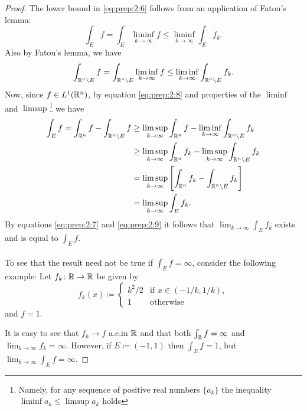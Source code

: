 \begin{proof}
The lower bound in \eqref{eq:prep:2:6} follows from an application of
Fatou's lemma:
\begin{equation}
  \label{eq:prep:2:7}
\int_E f=\int_E\liminf_{k\to\infty} f\leq\liminf_{k\to\infty}\int_E f_k.
\end{equation}
Also by Fatou's lemma, we have
\begin{equation}
  \label{eq:prep:2:8}
\int_{\mathbb{R}^n\setminus E}f=\int_{\mathbb{R}^n\setminus
  E}\liminf_{k\to\infty}f\leq\liminf_{k\to\infty}\int_{\mathbb{R}^n\setminus E}f_k.
\end{equation}
Now, since $f\in L^1(\mathbb{R}^n)$, by equation \eqref{eq:prep:2:8} and
properties of the $\liminf$ and $\limsup$\footnote{Namely, for any sequence
  of positive real numbers $\{a_k\}$ the inequality $\liminf a_k\leq\limsup
  a_k$ holds} we have
\begin{equation}
\label{eq:prep:2:9}
\begin{aligned}
\int_Ef=\int_{\mathbb{R}^n}f-\int_{\mathbb{R}^n\setminus E}f
&\geq\limsup_{k\to\infty}\int_{\mathbb{R}^n}f-\liminf_{k\to\infty}\int_{\mathbb{R}^n\setminus
E}f_k\\
&\geq\limsup_{k\to\infty}\int_{\mathbb{R}^n}f_k-\limsup_{k\to\infty}\int_{\mathbb{R}^n\setminus
  E}f_k\\
&=\limsup_{k\to\infty}\left[\int_{\mathbb{R}^n}f_k-\int_{\mathbb{R}^n\setminus
    E}f_k\right]\\
&=\limsup_{k\to\infty}\int_Ef_k.
\end{aligned}
\end{equation}
By equations \eqref{eq:prep:2:7} and \eqref{eq:prep:2:9} it follows
that $\lim_{k\to\infty}\int_E f_k$ exists and is equal to $\int_E f$.
\\\\
To see that the result need not be true if $\int_Ef=\infty$, consider the
following example: Let $f_k\colon\mathbb{R}\to\mathbb{R}$ be given by
\begin{equation}
\label{eq:prep:2:11}
f_k(x)\coloneqq
\begin{cases}
k^2/2&\text{if $x\in(-1/k,1/k)$},\\
1&\text{otherwise}
\end{cases}
\end{equation}
and $f=1$.

It is easy to see that $f_k\to f$ a.e.\@ in $\mathbb{R}$ and that both $\int_{\mathbb{R}}
f=\infty$ and $\lim_{k\to\infty}f_k=\infty$. However, if $E\coloneqq(-1,1)$
then $\int_E f=1$, but $\lim_{k\to\infty}\int_Ef=\infty$.
\end{proof}

